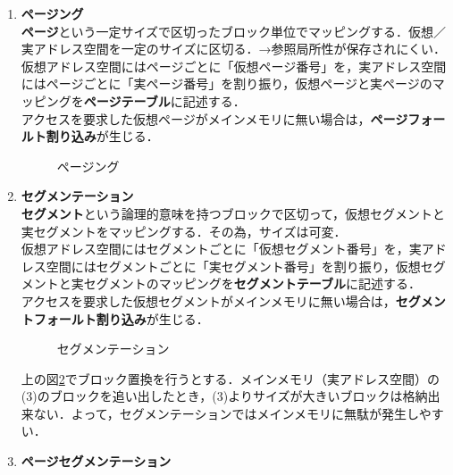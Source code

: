 \begin{enumerate}[label=\textbf{(\Alph*)}, labelsep=10pt, leftmargin=23pt]
	\item \textbf{ページング}\\
		\textbf{ページ}という一定サイズで区切ったブロック単位でマッピングする．仮想／実アドレス空間を一定のサイズに区切る．→参照局所性が保存されにくい．\\
		仮想アドレス空間にはページごとに「仮想ページ番号」を，実アドレス空間にはページごとに「実ページ番号」を割り振り，仮想ページと実ページのマッピングを\textbf{ページテーブル}に記述する．\\
		アクセスを要求した仮想ページがメインメモリに無い場合は，\textbf{ページフォールト割り込み}が生じる．
		\begin{figure}[H]
			\begin{center}
				\caption{ページング}
				\label{fig27-8}
			\end{center}
		\end{figure}
	\item \textbf{セグメンテーション}\\
		\textbf{セグメント}という論理的意味を持つブロックで区切って，仮想セグメントと実セグメントをマッピングする．その為，サイズは可変．\\
		仮想アドレス空間にはセグメントごとに「仮想セグメント番号」を，実アドレス空間にはセグメントごとに「実セグメント番号」を割り振り，仮想セグメントと実セグメントのマッピングを\textbf{セグメントテーブル}に記述する．\\
		アクセスを要求した仮想セグメントがメインメモリに無い場合は，\textbf{セグメントフォールト割り込み}が生じる．
		\begin{figure}[H]
			\begin{center}
				\caption{セグメンテーション}
				\label{fig27-9}
			\end{center}
		\end{figure}
		上の図\ref{fig27-9}でブロック置換を行うとする．メインメモリ（実アドレス空間）の(3)のブロックを追い出したとき，(3)よりサイズが大きいブロックは格納出来ない．よって，セグメンテーションではメインメモリに無駄が発生しやすい．
	\item \textbf{ページセグメンテーション}\\

\end{enumerate}
